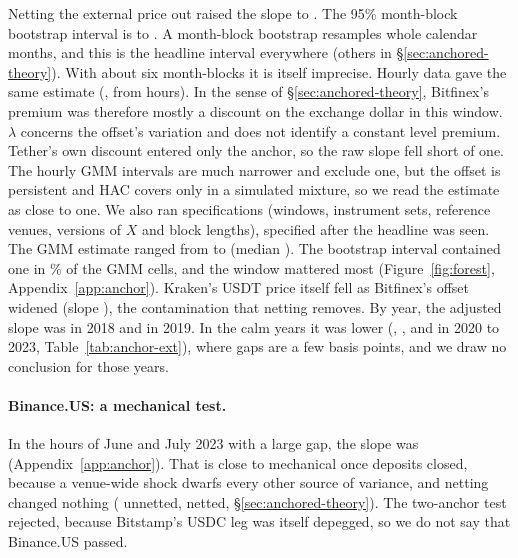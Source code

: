 \documentclass[sigconf,review,anonymous]{acmart}
\begin{document}
Netting the external price out raised the slope to \NumKStressDaySlopeAdj{}. The 95\% month-block bootstrap interval is
\NumKStressDaySlopeAdjMoLo{} to \NumKStressDaySlopeAdjMoHi{}. A month-block bootstrap resamples whole calendar months, and this is the headline interval everywhere (others in \S\ref{sec:anchored-theory}). With about six month-blocks
it is itself imprecise. Hourly data gave the same estimate (\NumKStressHrSlopeAdj{}, from \NumKStressHrN{} hours).
In the sense of \S\ref{sec:anchored-theory}, Bitfinex's
premium was therefore mostly a discount on the exchange dollar in this window. $\lambda$ concerns the offset's variation
and does not identify a constant level premium. Tether's own discount entered only the anchor, so the raw slope
fell short of one. The hourly GMM intervals are much narrower and exclude one, but the offset is persistent and HAC covers only \NumGSThreeCover{} in a simulated mixture, so we read the estimate as close to one. We also ran \NumRACells{} specifications (windows, instrument sets, reference venues, versions of $X$ and
block lengths), specified after the headline was seen. The GMM estimate ranged from
\NumRAGmmMin{} to \NumRAGmmMax{} (median \NumRAGmmMed{}). The bootstrap interval contained one in \NumRAGmmBootOnePct\% of
the GMM cells, and the window mattered most (Figure~\ref{fig:forest}, Appendix~\ref{app:anchor}).
Kraken's USDT price itself fell as Bitfinex's offset widened (slope \NumRAAThreeSlope{}), the contamination that netting
removes. By year, the adjusted slope was \NumKYTwoZeroOneEightDaySlopeAdj{} in 2018 and
\NumKYTwoZeroOneNineDaySlopeAdj{} in 2019. In the calm years it was lower (\NumKYTwoZeroTwoZeroDaySlopeAdj{}, \NumKYTwoZeroTwoOneDaySlopeAdj{}, \NumKYTwoZeroTwoTwoDaySlopeAdj{} and
\NumKYTwoZeroTwoThreeDaySlopeAdj{} in 2020 to 2023, Table~\ref{tab:anchor-ext}), where gaps are a few basis points, and we draw no conclusion for those years.

\paragraph{Binance.US: a mechanical test.} In the hours of June and July 2023 with a large gap, the slope was
\NumUAnchorBnusSlope{} (Appendix~\ref{app:anchor}). That is close to mechanical once deposits closed, because a venue-wide shock
dwarfs every other source of variance, and netting changed nothing (\NumGBusTwoRawLam{} unnetted, \NumGBusTwoLam{} netted,
\S\ref{sec:anchored-theory}). The two-anchor test rejected, because Bitstamp's USDC leg was itself depegged, so we do
not say that Binance.US passed.
\end{document}
